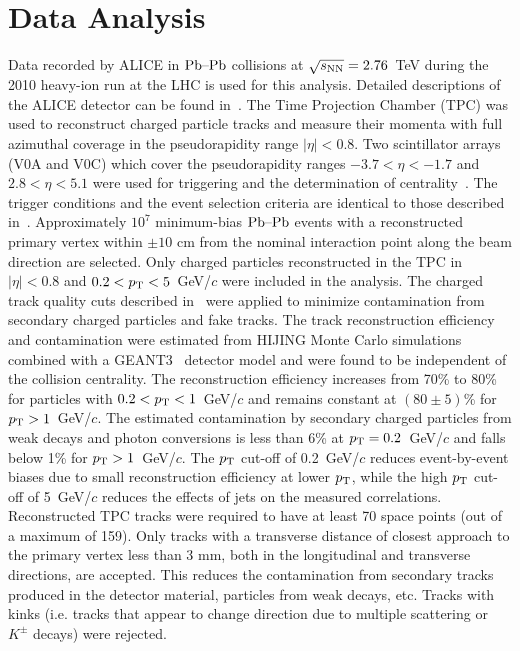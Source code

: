 \section{Data Analysis}
\label{sec:experiment}
Data recorded by ALICE in $\textnormal{Pb--Pb}$ collisions at $\sqrt{s_{\textnormal{NN}}}=2.76$~TeV during the 2010 heavy-ion run at the
LHC is used for this analysis. Detailed descriptions of the ALICE
detector can be found
in~\cite{Aamodt:2008zz,Carminati:2004fp,Alessandro:2006yt}. The Time
Projection Chamber (TPC) was used to reconstruct charged particle
tracks and measure their momenta with full azimuthal coverage in the
pseudorapidity range $|\eta|<0.8$. Two scintillator
arrays (V0A and V0C) which cover the pseudorapidity  ranges $-3.7<\eta<-1.7$
and $2.8<\eta<5.1$ were used for triggering and the determination of
centrality~\cite{Aamodt:2010cz}. The trigger
conditions and the event selection criteria are identical to those
described in~\cite{Aamodt:2010pa, Aamodt:2010cz}.
Approximately $10^7$ minimum-bias $\textnormal{Pb--Pb}$ events with
a reconstructed primary vertex within $\pm 10$ cm from the nominal
interaction point along the beam direction are selected. Only charged particles reconstructed in the TPC in $|\eta|<0.8$
and $0.2<p_{\rm T}<5$~GeV/$c$ were included in the analysis. The charged track quality cuts
described in~\cite{Aamodt:2010pa} were applied to minimize
contamination from secondary charged particles and fake tracks.
The track reconstruction efficiency and contamination
were estimated from HIJING Monte Carlo
simulations~\cite{Wang:1991hta} combined with a GEANT3~\cite{Brun:1994aa} detector model and were found to be independent of
the collision centrality. The reconstruction efficiency increases from
70\% to 80\% for particles with $0.2<p_{\rm T}<1$~GeV/$c$ and remains
constant at $(80 \pm 5)$\% for $p_{\rm T}>1$~GeV/$c$. The estimated
contamination by secondary charged particles from weak decays and
photon conversions is less than 6\% at $p_{\rm T}=0.2$~GeV/$c$ and falls
below 1\% for $p_{\rm T}>1$~GeV/$c$.
The $p_{\rm T}$ cut-off of 0.2~GeV/$c$ reduces event-by-event biases due to small reconstruction efficiency 
at lower $p_{\rm T}$, while the high $p_{\rm T}$ cut-off of 5~GeV/$c$ reduces the effects of jets on the measured correlations. 
Reconstructed TPC tracks were required to have at least 70 space points (out of a maximum of 159). 
Only tracks with a transverse distance of closest approach to the primary vertex less than 3 mm, both in the longitudinal and transverse directions, are accepted. This reduces the contamination from secondary tracks produced in the detector material, particles from weak decays, etc. Tracks with kinks (i.e. tracks that appear to change direction due to multiple scattering or $K^{\pm}$ decays) were rejected.


